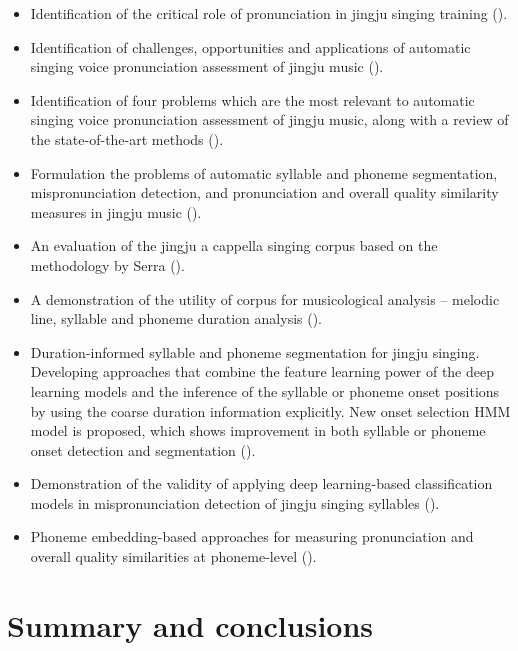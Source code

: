 \begin{itemize}[leftmargin=*]
\item Identification of the critical role of pronunciation in jingju singing training ().
\item Identification of challenges, opportunities and applications of automatic singing voice pronunciation assessment of jingju music ().
\item Identification of four problems which are the most relevant to automatic singing voice pronunciation assessment of jingju music, along with a review of the state-of-the-art methods (). 
\item Formulation the problems of automatic syllable and phoneme segmentation, mispronunciation detection, and pronunciation and overall quality similarity measures in jingju music ().
\item An evaluation of the jingju a cappella singing corpus based on the methodology by Serra \cite{Serra2014} ().
\item A demonstration of the utility of corpus for musicological analysis -- melodic line, syllable and phoneme duration analysis ().
\item Duration-informed syllable and phoneme segmentation for jingju singing. Developing approaches that combine the feature learning power of the deep learning models and the inference of the syllable or phoneme onset positions by using the coarse duration information explicitly. New onset selection HMM model is proposed, which shows improvement in both syllable or phoneme onset detection and segmentation ().
\item Demonstration of the validity of applying deep learning-based classification models in mispronunciation detection of jingju singing syllables (). 
\item Phoneme embedding-based approaches for measuring pronunciation and overall quality similarities at phoneme-level ().
\end{itemize}

\section{Summary and conclusions}

